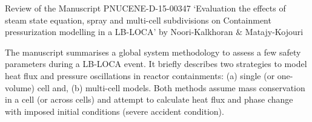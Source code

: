 \documentclass[14pt,twoside]{report}
\begin{document}
\clearpage




\begin{center}
  {\Large Review of the Manuscript PNUCENE-D-15-00347 `Evaluation the effects of steam state equation, spray and multi-cell subdivisions on Containment pressurization modelling in a LB-LOCA' by Noori-Kalkhoran $\&$ Matajy-Kojouri}
\end{center}

\medskip

The manuscript summarises a global system methodology to assess a few safety parameters during a LB-LOCA event. It briefly describes two strategies to model heat flux and pressure oscillations in reactor containments: (a) single (or one-volume) cell and, (b) multi-cell models. Both methods assume mass conservation in a cell (or across cells) and attempt to calculate heat flux and phase change with imposed initial conditions (severe accident condition).
\end{document}
